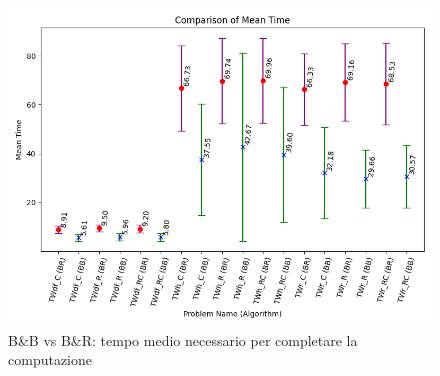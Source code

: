 \documentclass[
    article,            %
    12pt,                %
    oneside,            %
    a4paper,            %
    english,            %
    italian,                %
    sumario=tradicional,
]{abntex2}
\begin{document}
\vspace*{\fill}
\newpage{}
\vspace*{\fill}
\begin{figure}[h!]
    \centering
    \includegraphics[width=1.0\textwidth]{Images/mean_time.png}
    \caption{B\&B vs B\&R: tempo medio necessario per completare la computazione}
    \label{fig:mean_time}
\end{figure}
\vspace*{\fill}
\newpage{}
\printbibliography[title=Bibliografia]
\end{document}
